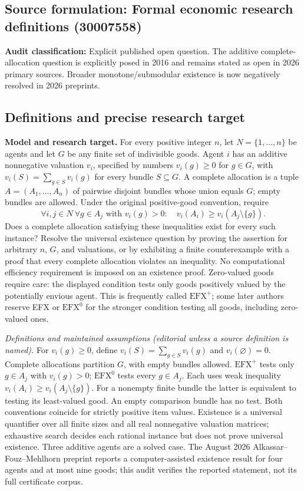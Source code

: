 \documentclass[11pt,a4paper]{article}
\begin{document}
\subsection*{Source formulation: Formal economic research definitions (30007558)}
\label{definitions:problem:30007558}
\textbf{Audit classification:} Explicit published open question. The additive complete-allocation question is explicitly posed in 2016 and remains stated as open in 2026 primary sources. Broader monotone/submodular existence is now negatively resolved in 2026 preprints.
\subsection*{Definitions and precise research target}
\textbf{Model and research target.} For every positive integer \(n\), let \(N=\{1,\ldots,n\}\) be agents and let \(G\) be any finite set of indivisible goods. Agent \(i\) has an additive nonnegative valuation \(v_i\), specified by numbers \(v_i(g)\geq0\) for \(g\in G\), with \(v_i(S)=\sum_{g\in S}v_i(g)\) for every bundle \(S\subseteq G\). A complete allocation is a tuple \(A=(A_1,\ldots,A_n)\) of pairwise disjoint bundles whose union equals \(G\); empty bundles are allowed. Under the original positive-good convention, require
\[
 \forall i,j\in N\ \forall g\in A_j\text{ with }v_i(g)>0:
 \quad v_i(A_i)\geq v_i(A_j\setminus\{g\}).
\]
Does a complete allocation satisfying these inequalities exist for every such instance? Resolve the universal existence question by proving the assertion for arbitrary \(n\), \(G\), and valuations, or by exhibiting a finite counterexample with a proof that every complete allocation violates an inequality. No computational efficiency requirement is imposed on an existence proof. Zero-valued goods require care: the displayed condition tests only goods positively valued by the potentially envious agent. This is frequently called \(\mathrm{EFX}^{+}\); some later authors reserve EFX or \(\mathrm{EFX}^{0}\) for the stronger condition testing all goods, including zero-valued ones.

\emph{Definitions and maintained assumptions (editorial unless a source definition is named).} For \(v_i(g)\ge0\), define \(v_i(S)=\sum_{g\in S}v_i(g)\) and \(v_i(\varnothing)=0\). Complete allocations partition \(G\), with empty bundles allowed. \(\mathrm{EFX}^{+}\) tests only \(g\in A_j\) with \(v_i(g)>0\); \(\mathrm{EFX}^{0}\) tests every \(g\in A_j\). Each uses weak inequality \(v_i(A_i)\ge v_i(A_j\setminus\{g\})\). For a nonempty finite bundle the latter is equivalent to testing its least-valued good. An empty comparison bundle has no test. Both conventions coincide for strictly positive item values. Existence is a universal quantifier over all finite sizes and all real nonnegative valuation matrices; exhaustive search decides each rational instance but does not prove universal existence. Three additive agents are a solved case. The August 2026 Alkassar--Fouz--Mehlhorn preprint reports a computer-assisted existence result for four agents and at most nine goods; this audit verifies the reported statement, not its full certificate corpus.
\end{document}
